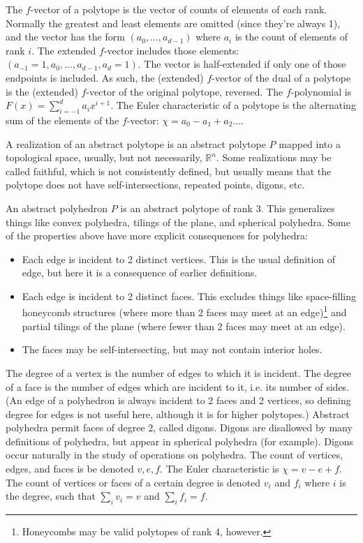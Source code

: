 \documentclass{article}
\begin{document}
The $f$-vector of a polytope is the vector of counts of elements of each rank.
Normally the greatest and least elements are omitted (since they're always 1),
and the vector has the form $(a_0, \ldots, a_{d-1})$ where $a_i$ is the count
of elements of rank $i$. The extended $f$-vector includes those elements:
$(a_{-1}=1, a_0, \ldots, a_{d-1}, a_d=1)$. The vector is half-extended if
only one of those endpoints is included. As such, the (extended) $f$-vector of
the dual of a polytope is the (extended) $f$-vector of the original polytope,
reversed. The $f$-polynomial is $F(x) = \sum_{i=-1}^d a_i x^{i+1}$.
The Euler characteristic of a polytope is the alternating
sum of the elements of the $f$-vector: $\chi = a_0 - a_1 + a_2 \ldots$.

A realization of an abstract polytope is an abstract polytope $P$ mapped into
a topological space, usually, but not necessarily, $\mathbb{R}^n$. Some
realizations may be called faithful, which is not consistently defined, but
usually means that the polytope does not have self-intersections,
repeated points, digons, etc.

An abstract polyhedron $P$ is an abstract polytope of rank 3. This generalizes
things like convex polyhedra, tilings of the plane, and spherical polyhedra.
Some of the properties above have more explicit consequences for
polyhedra: \cite{grunbaum1}
\begin{itemize}
  \item Each edge is incident to 2 distinct vertices. This is the usual
  definition of edge, but here it is a consequence of earlier definitions.
  \item Each edge is incident to 2 distinct faces. This excludes things like
  space-filling honeycomb structures (where more than 2 faces may meet at an
  edge)\footnote{Honeycombs may be valid polytopes of rank 4, however.} and
  partial tilings of the plane (where fewer than 2 faces may meet at an edge).
  \item The faces may be self-intersecting, but may not contain interior holes.
\end{itemize}
The degree of a vertex is the number of edges to which it is incident. The
degree of a face is the number of edges which are incident to it, i.e. its
number of sides. (An edge of a polyhedron is always incident to 2 faces and 2
vertices, so defining degree for edges is not useful here, although it is for
higher polytopes.)
Abstract polyhedra permit faces of degree 2, called digons. Digons are
disallowed by many definitions of polyhedra, but appear in spherical polyhedra
(for example). Digons occur naturally in the study of operations on polyhedra.
The count of vertices, edges, and faces is be denoted $v, e, f$. The Euler
characteristic is $\chi = v - e + f$. The count of vertices or faces of a
certain degree is denoted $v_i$ and $f_i$ where $i$ is the degree, such that
$\sum_i v_i = v$ and $\sum_i f_i = f$.
\end{document}
